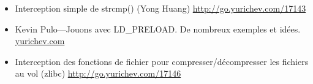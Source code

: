 \begin{itemize}

\item
Interception simple de strcmp() (Yong Huang)
\url{http://go.yurichev.com/17143}

\item
Kevin Pulo---Jouons avec LD\_PRELOAD. De nombreux exemples et idées.
\href{http://go.yurichev.com/17145}{yurichev.com}

\item
Interception des fonctions de fichier pour compresser/décompresser les fichiers au vol (zlibc) \url{http://go.yurichev.com/17146}

\end{itemize}
